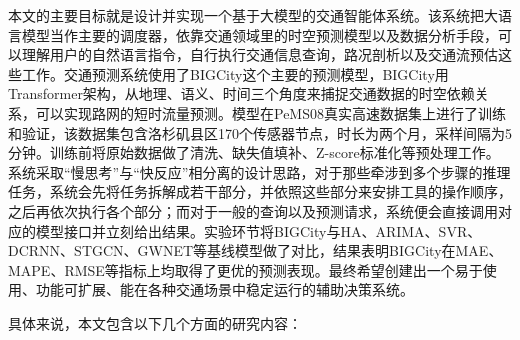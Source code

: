 本文的主要目标就是设计并实现一个基于大模型的交通智能体系统。该系统把大语言模型当作主要的调度器，依靠交通领域里的时空预测模型以及数据分析手段，可以理解用户的自然语言指令，自行执行交通信息查询，路况剖析以及交通流预估这些工作。交通预测系统使用了BIGCity这个主要的预测模型，BIGCity用Transformer架构，从地理、语义、时间三个角度来捕捉交通数据的时空依赖关系，可以实现路网的短时流量预测。模型在PeMS08真实高速数据集上进行了训练和验证，该数据集包含洛杉矶县区170个传感器节点，时长为两个月，采样间隔为5分钟。训练前将原始数据做了清洗、缺失值填补、Z-score标准化等预处理工作。系统采取“慢思考”与“快反应”相分离的设计思路，对于那些牵涉到多个步骤的推理任务，系统会先将任务拆解成若干部分，并依照这些部分来安排工具的操作顺序，之后再依次执行各个部分；而对于一般的查询以及预测请求，系统便会直接调用对应的模型接口并立刻给出结果。实验环节将BIGCity与HA、ARIMA、SVR、DCRNN、STGCN、GWNET等基线模型做了对比，结果表明BIGCity在MAE、MAPE、RMSE等指标上均取得了更优的预测表现。最终希望创建出一个易于使用、功能可扩展、能在各种交通场景中稳定运行的辅助决策系统。

具体来说，本文包含以下几个方面的研究内容：

